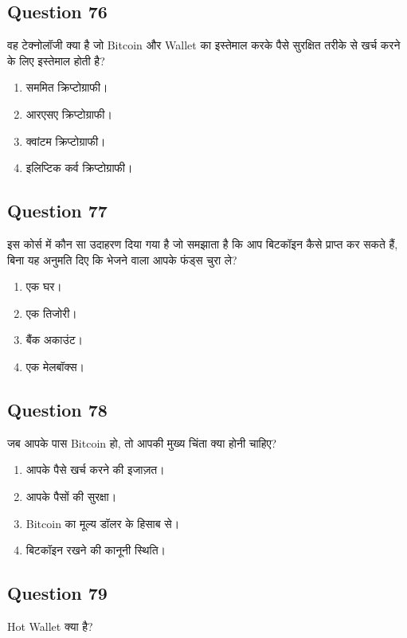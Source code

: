 \documentclass[12pt,a4paper]{article}
\begin{document}
\bigskip


\subsection*{Question 76}
वह टेक्नोलॉजी क्या है जो Bitcoin और Wallet का इस्तेमाल करके पैसे सुरक्षित तरीके से खर्च करने के लिए इस्तेमाल होती है?

\begin{enumerate}[label=\Alph*., leftmargin=*]
\item सममित क्रिप्टोग्राफी।
\item आरएसए क्रिप्टोग्राफी।
\item क्वांटम क्रिप्टोग्राफी।
\item इलिप्टिक कर्व क्रिप्टोग्राफी।
\end{enumerate}

\bigskip


\subsection*{Question 77}
इस कोर्स में कौन सा उदाहरण दिया गया है जो समझाता है कि आप बिटकॉइन कैसे प्राप्त कर सकते हैं, बिना यह अनुमति दिए कि भेजने वाला आपके फंड्स चुरा ले?

\begin{enumerate}[label=\Alph*., leftmargin=*]
\item एक घर।
\item एक तिजोरी।
\item बैंक अकाउंट।
\item एक मेलबॉक्स।
\end{enumerate}

\bigskip


\subsection*{Question 78}
जब आपके पास Bitcoin हो, तो आपकी मुख्य चिंता क्या होनी चाहिए?

\begin{enumerate}[label=\Alph*., leftmargin=*]
\item आपके पैसे खर्च करने की इजाज़त।
\item आपके पैसों की सुरक्षा।
\item Bitcoin का मूल्य डॉलर के हिसाब से।
\item बिटकॉइन रखने की कानूनी स्थिति।
\end{enumerate}

\bigskip


\subsection*{Question 79}
Hot Wallet क्या है?
\end{document}
